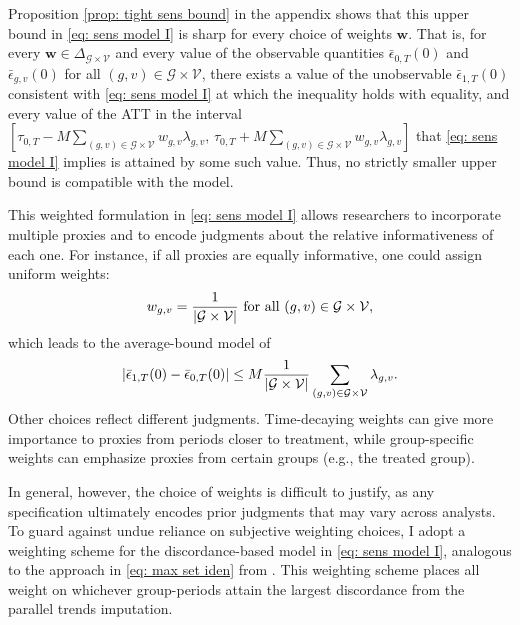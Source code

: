 \documentclass[twoside,11pt]{article}
\begin{document}
Proposition \ref{prop: tight sens bound} in the appendix shows that this upper bound in \eqref{eq: sens model I} is sharp for every choice of weights $\bm{w}$. That is, for every $\bm{w} \in \Delta_{\mathcal{G} \times \mathcal{V}}$ and every value of the observable quantities $\bar{\epsilon}_{0,T}(0)$ and $\bar{\epsilon}_{g,v}(0)$ for all $(g,v) \in \mathcal{G} \times \mathcal{V}$, there exists a value of the unobservable $\bar{\epsilon}_{1,T}(0)$ consistent with \eqref{eq: sens model I} at which the inequality holds with equality, and every value of the \textrm{ATT} in the interval $\left[\tau_{0,T} - M \sum_{(g,v) \in \mathcal{G} \times \mathcal{V}} w_{g,v} \lambda_{g,v}, \, \tau_{0,T} + M \sum_{(g,v) \in \mathcal{G} \times \mathcal{V}} w_{g,v} \lambda_{g,v}\right]$ that \eqref{eq: sens model I} implies is attained by some such value. Thus, no strictly smaller upper bound is compatible with the model.

This weighted formulation in \eqref{eq: sens model I} allows researchers to incorporate multiple proxies and to encode judgments about the relative informativeness of each one. For instance, if all proxies are equally informative, one could assign uniform weights:
\begin{align*}
w_{g,v} = \dfrac{1}{\lvert\mathcal{G} \times \mathcal{V}\rvert} \text{ for all } (g,v) \in \mathcal{G} \times \mathcal{V},
\end{align*}
which leads to the average-bound model of
\begin{align} \label{eq: avg sens model I}
\lvert\bar{\epsilon}_{1,T}(0) - \bar{\epsilon}_{0,T}(0)\rvert \leq M \frac{1}{\lvert\mathcal{G} \times \mathcal{V}\rvert} \sum_{(g,v) \in \mathcal{G} \times \mathcal{V}} \lambda_{g,v}.
\end{align}
Other choices reflect different judgments. Time-decaying weights can give more importance to proxies from periods closer to treatment, while group-specific weights can emphasize proxies from certain groups (e.g., the treated group).

In general, however, the choice of weights is difficult to justify, as any specification ultimately encodes prior judgments that may vary across analysts. To guard against undue reliance on subjective weighting choices, I adopt a weighting scheme for the discordance-based model in \eqref{eq: sens model I}, analogous to the approach in \eqref{eq: max set iden} from \citet{rambachanroth2023}. This weighting scheme places all weight on whichever group-periods attain the largest discordance from the parallel trends imputation.
\end{document}
